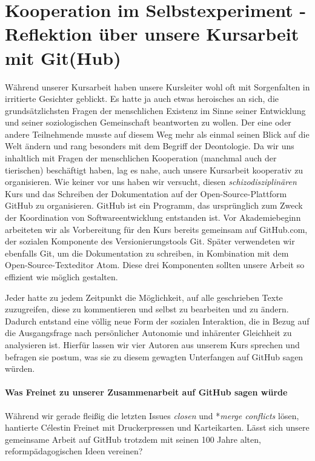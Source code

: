 \section{Kooperation im Selbstexperiment - Reflektion über unsere Kursarbeit mit Git(Hub)}

Während unserer Kursarbeit haben unsere Kursleiter wohl oft mit Sorgenfalten in irritierte Gesichter geblickt.
Es hatte ja auch etwas heroisches an sich, die grundsätzlichsten Fragen der menschlichen Existenz im Sinne seiner Entwicklung und seiner soziologischen Gemeinschaft beantworten zu wollen.
Der eine oder andere Teilnehmende musste auf diesem Weg mehr als einmal seinen Blick auf die Welt ändern und rang besonders mit dem Begriff der Deontologie.
Da wir uns inhaltlich mit Fragen der menschlichen Kooperation (manchmal auch der tierischen) beschäftigt haben, lag es nahe, auch unsere Kursarbeit kooperativ zu organisieren.
Wie keiner vor uns haben wir versucht, diesen \emph{schizodisziplinären} Kurs und das Schreiben der Dokumentation auf der Open-Source-Plattform GitHub zu organisieren.
GitHub ist ein Programm, das ursprünglich zum Zweck der Koordination von Softwareentwicklung entstanden ist.
Vor Akademiebeginn arbeiteten wir als Vorbereitung für den Kurs bereits gemeinsam auf GitHub.com, der sozialen Komponente des Versionierungstools Git.
Später verwendeten wir ebenfalls Git, um die Dokumentation zu schreiben, in Kombination mit dem Open-Source-Texteditor Atom.
Diese drei Komponenten sollten unsere Arbeit so effizient wie möglich gestalten.

Jeder hatte zu jedem Zeitpunkt die Möglichkeit, auf alle geschrieben Texte zuzugreifen, diese zu kommentieren und selbst zu bearbeiten und zu ändern.
Dadurch entstand eine völlig neue Form der sozialen Interaktion, die in Bezug auf die Ausgangsfrage nach persönlicher Autonomie und inhärenter Gleichheit zu analysieren ist.
Hierfür lassen wir vier Autoren aus unserem Kurs sprechen und befragen sie postum, was sie zu diesem gewagten Unterfangen auf GitHub sagen würden.


\paragraph{Was Freinet zu unserer Zusammenarbeit auf GitHub sagen würde}

Während wir gerade fleißig die letzten Issues \emph{closen} und *\emph{merge conflicts} lösen, hantierte Célestin Freinet mit Druckerpressen und Karteikarten.
Lässt sich unsere gemeinsame Arbeit auf GitHub trotzdem mit seinen 100 Jahre alten, reformpädagogischen Ideen vereinen?

